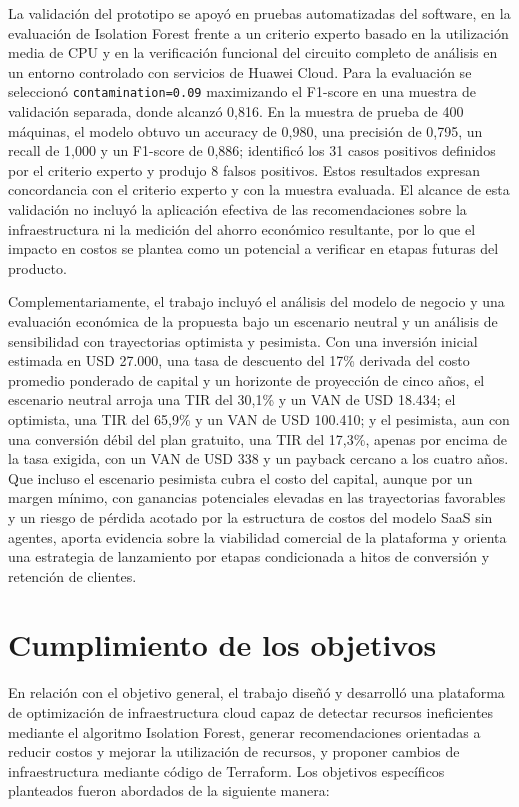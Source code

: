 La validación del prototipo se apoyó en pruebas automatizadas del software, en la evaluación de Isolation Forest frente a un criterio experto basado en la utilización media de CPU y en la verificación funcional del circuito completo de análisis en un entorno controlado con servicios de Huawei Cloud. Para la evaluación se seleccionó \texttt{contamination=0.09} maximizando el F1-score en una muestra de validación separada, donde alcanzó 0,816. En la muestra de prueba de 400 máquinas, el modelo obtuvo un accuracy de 0,980, una precisión de 0,795, un recall de 1,000 y un F1-score de 0,886; identificó los 31 casos positivos definidos por el criterio experto y produjo 8 falsos positivos. Estos resultados expresan concordancia con el criterio experto y con la muestra evaluada. El alcance de esta validación no incluyó la aplicación efectiva de las recomendaciones sobre la infraestructura ni la medición del ahorro económico resultante, por lo que el impacto en costos se plantea como un potencial a verificar en etapas futuras del producto.

Complementariamente, el trabajo incluyó el análisis del modelo de negocio y una evaluación económica de la propuesta bajo un escenario neutral y un análisis de sensibilidad con trayectorias optimista y pesimista. Con una inversión inicial estimada en USD 27.000, una tasa de descuento del 17\% derivada del costo promedio ponderado de capital y un horizonte de proyección de cinco años, el escenario neutral arroja una TIR del 30,1\% y un VAN de USD 18.434; el optimista, una TIR del 65,9\% y un VAN de USD 100.410; y el pesimista, aun con una conversión débil del plan gratuito, una TIR del 17,3\%, apenas por encima de la tasa exigida, con un VAN de USD 338 y un payback cercano a los cuatro años. Que incluso el escenario pesimista cubra el costo del capital, aunque por un margen mínimo, con ganancias potenciales elevadas en las trayectorias favorables y un riesgo de pérdida acotado por la estructura de costos del modelo SaaS sin agentes, aporta evidencia sobre la viabilidad comercial de la plataforma y orienta una estrategia de lanzamiento por etapas condicionada a hitos de conversión y retención de clientes.

\section{Cumplimiento de los objetivos}

En relación con el objetivo general, el trabajo diseñó y desarrolló una plataforma de optimización de infraestructura cloud capaz de detectar recursos ineficientes mediante el algoritmo Isolation Forest, generar recomendaciones orientadas a reducir costos y mejorar la utilización de recursos, y proponer cambios de infraestructura mediante código de Terraform. Los objetivos específicos planteados fueron abordados de la siguiente manera:

